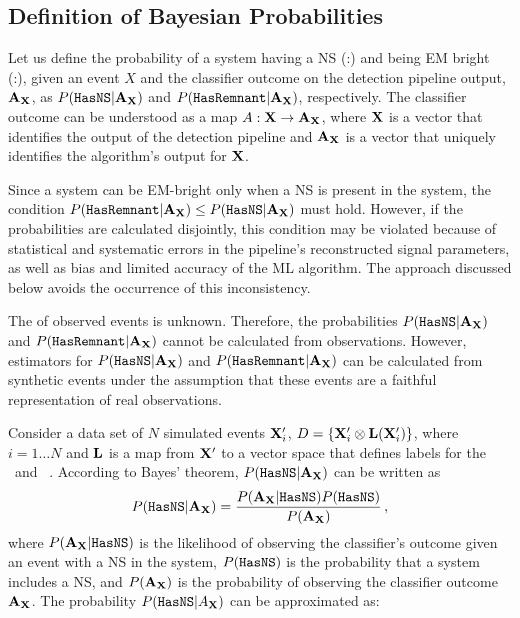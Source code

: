 \subsection{Definition of Bayesian Probabilities} \label{bayesian_probs}

Let us define the probability of a system having a \ac{NS} (\hasns:\true) and being \ac{EM} bright (\hasrem:\true), given an event $X$ and the classifier outcome on the detection pipeline
output, ${\bf A}_{\bf X}$, as $P({{\tt HasNS}}|{\bf A}_{\bf X})$ and $P({{\tt HasRemnant}}|{\bf A}_{\bf X})$, respectively. The classifier outcome can be understood as a map $A:{\bf X}\to {\bf A}_{\bf X}$,
where $\bf X$ is a vector that identifies the output of the detection pipeline and ${\bf A}_{\bf X}$ is a vector that uniquely identifies the algorithm's output for $\bf X$. 

Since a system can be EM-bright only when a \ac{NS} is present in the system, the condition $P({{\tt HasRemnant}}|{\bf A}_{\bf X})\le P({{\tt HasNS}}|{\bf A}_{\bf X})$ must hold. However, if the
probabilities are calculated disjointly, this condition may be violated because of statistical and systematic errors in the pipeline's reconstructed signal parameters, as well as bias and
limited accuracy of the \ac{ML} algorithm. The approach discussed below avoids the occurrence of this inconsistency.

The  of observed events is unknown. Therefore, the probabilities $P({{\tt HasNS}}|{\bf A}_{\bf X})$ and $P({{\tt HasRemnant}}|{\bf A}_{\bf X})$ cannot be calculated from observations. However,
estimators for $P({{\tt HasNS}}|{\bf A}_{\bf X})$ and $P({{\tt HasRemnant}}|{\bf A}_{\bf X})$ can be calculated from synthetic events under the assumption that these events are a faithful representation of
real observations.

Consider a data set of $N$ simulated events ${\bf X}'_i$, $D=\{{\bf X}'_i\otimes{\bf L}({\bf X}'_i)\}$, where $i=1\dots N$ and ${\bf L}$ is a map from ${\bf X}'$ to a vector space
that defines labels for the \hasns\ and \hasrem\ . According to Bayes' theorem, $P({{\tt HasNS}}|{\bf A}_{\bf X})$  can be written as 
%
\begin{equation}
P({{\tt HasNS}}|{\bf A}_{\bf X})=\frac{P({\bf A}_{\bf X}|{{\tt HasNS}})P({{\tt HasNS}})}{P({\bf A}_{\bf X})}\,,
\label{bayes}
\end{equation}
%
where $P({\bf A}_{\bf X}|{{\tt HasNS}})$ is the likelihood of observing the classifier's outcome given an event with a \ac{NS} in the system, $P({{\tt HasNS}})$ is the probability that a system includes a \ac{NS}, and $P({\bf A}_{\bf X})$ is the probability of observing the classifier outcome ${\bf A}_{\bf X}$. The probability $P({{\tt HasNS}}|A_{\bf X})$ can be approximated as:  
%

